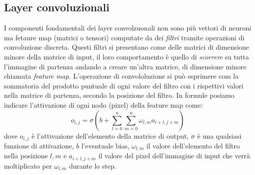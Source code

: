 \documentclass[12pt,a4paper,openright,twoside]{report}
\begin{document}
\subsection{Layer convoluzionali}
I componenti fondamentali dei layer convolzuonali non sono più vettori di neuroni ma fetaure map (matrici o tensori) computate da dei \emph{filtri} tramite operazioni di convoluzione discreta.
Questi filtri si presentano come delle matrici di dimensione minore della matrice di input, il loro comportamento è quello di \emph{scorrere} su tutta l'immagine di partenza andando a creare un'altra matrice, di dimensione minore chiamata \emph{feature map.}
L'operazione di convololuzione si può esprimere com la sommatoria del prodotto puntuale di ogni valore del filtro con i rispettivi valori nella matrice di partenza, secondo la posizione del filtro.
\newpage
In formule posiamo indicare l'attivazione di ogni nodo (pixel) della feature map come: 
\begin{equation}
    o_{i,j} = \sigma(b + \sum _{l=0}^{n}\sum _{m=0}^{n}\omega_{l,m}a_{i+l, j+m})
\end{equation}
dove $o_{i,j}$ è l'attivazione dell'elemento della matrice di output, $\sigma$ è una qualsiasi funzione di attivazione, $b$ l'eventuale bias, $\omega_{l,m}$ il valore dell'elemento del filtro nella posizione $l,m$ e $a_{i+l, j+m}$ il valore del pixel dell'immagine di input che verrà moltiplicato per $\omega_{l,m}$ durante lo step.
\end{document}

